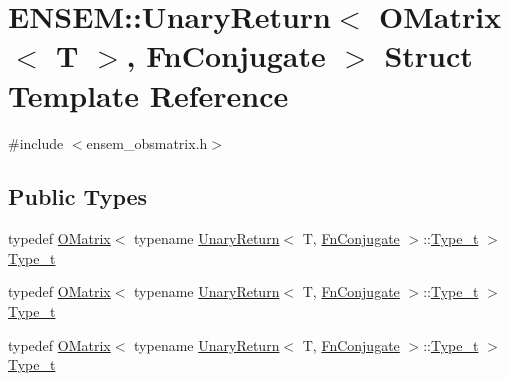 \hypertarget{structENSEM_1_1UnaryReturn_3_01OMatrix_3_01T_01_4_00_01FnConjugate_01_4}{}\section{E\+N\+S\+EM\+:\+:Unary\+Return$<$ O\+Matrix$<$ T $>$, Fn\+Conjugate $>$ Struct Template Reference}
\label{structENSEM_1_1UnaryReturn_3_01OMatrix_3_01T_01_4_00_01FnConjugate_01_4}


{\ttfamily \#include $<$ensem\+\_\+obsmatrix.\+h$>$}

\subsection*{Public Types}
\begin{DoxyCompactItemize}
\item 
typedef \mbox{\hyperlink{classENSEM_1_1OMatrix}{O\+Matrix}}$<$ typename \mbox{\hyperlink{structENSEM_1_1UnaryReturn}{Unary\+Return}}$<$ T, \mbox{\hyperlink{structENSEM_1_1FnConjugate}{Fn\+Conjugate}} $>$\+::\mbox{\hyperlink{structENSEM_1_1UnaryReturn_3_01OMatrix_3_01T_01_4_00_01FnConjugate_01_4_ac5de4bf0142b30100d4ade43fc2817d8}{Type\+\_\+t}} $>$ \mbox{\hyperlink{structENSEM_1_1UnaryReturn_3_01OMatrix_3_01T_01_4_00_01FnConjugate_01_4_ac5de4bf0142b30100d4ade43fc2817d8}{Type\+\_\+t}}
\item 
typedef \mbox{\hyperlink{classENSEM_1_1OMatrix}{O\+Matrix}}$<$ typename \mbox{\hyperlink{structENSEM_1_1UnaryReturn}{Unary\+Return}}$<$ T, \mbox{\hyperlink{structENSEM_1_1FnConjugate}{Fn\+Conjugate}} $>$\+::\mbox{\hyperlink{structENSEM_1_1UnaryReturn_3_01OMatrix_3_01T_01_4_00_01FnConjugate_01_4_ac5de4bf0142b30100d4ade43fc2817d8}{Type\+\_\+t}} $>$ \mbox{\hyperlink{structENSEM_1_1UnaryReturn_3_01OMatrix_3_01T_01_4_00_01FnConjugate_01_4_ac5de4bf0142b30100d4ade43fc2817d8}{Type\+\_\+t}}
\item 
typedef \mbox{\hyperlink{classENSEM_1_1OMatrix}{O\+Matrix}}$<$ typename \mbox{\hyperlink{structENSEM_1_1UnaryReturn}{Unary\+Return}}$<$ T, \mbox{\hyperlink{structENSEM_1_1FnConjugate}{Fn\+Conjugate}} $>$\+::\mbox{\hyperlink{structENSEM_1_1UnaryReturn_3_01OMatrix_3_01T_01_4_00_01FnConjugate_01_4_ac5de4bf0142b30100d4ade43fc2817d8}{Type\+\_\+t}} $>$ \mbox{\hyperlink{structENSEM_1_1UnaryReturn_3_01OMatrix_3_01T_01_4_00_01FnConjugate_01_4_ac5de4bf0142b30100d4ade43fc2817d8}{Type\+\_\+t}}
\end{DoxyCompactItemize}


